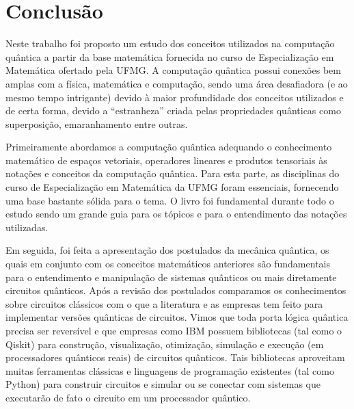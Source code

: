 
\chapter[Conclusão]{Conclusão}

Neste trabalho foi proposto um estudo dos conceitos utilizados na computação quântica a partir da base matemática fornecida no curso de Especialização em Matemática ofertado pela UFMG. A computação quântica possui conexões bem amplas com a física, matemática e computação, sendo uma área desafiadora (e ao mesmo tempo intrigante) devido à maior profundidade dos conceitos utilizados e de certa forma, devido a ``estranheza'' criada pelas propriedades quânticas como superposição, emaranhamento entre outras.

Primeiramente abordamos a computação quântica adequando o conhecimento matemático de espaços vetoriais, operadores lineares e produtos tensoriais às notações e conceitos da computação quântica. Para esta parte, as disciplinas do curso de Especialização em Matemática da UFMG foram essenciais, fornecendo uma base bastante sólida para o tema. O livro \cite{nielsen2010quantum} foi fundamental durante todo o estudo sendo um grande guia para os tópicos e para o entendimento das notações utilizadas.

Em seguida, foi feita a apresentação dos postulados da mecânica quântica, os quais em conjunto com os conceitos matemáticos anteriores são fundamentais para o entendimento e manipulação de sistemas quânticos ou mais diretamente circuitos quânticos. Após a revisão dos postulados comparamos os conhecimentos sobre circuitos clássicos com o que a literatura e as empresas tem feito para implementar versões quânticas de circuitos. Vimos que toda porta lógica quântica precisa ser reversível e que empresas como IBM possuem bibliotecas (tal como o Qiskit) para construção, visualização, otimização, simulação e execução (em processadores quânticos reais) de circuitos quânticos. Tais bibliotecas aproveitam muitas ferramentas clássicas e linguagens de programação existentes (tal como Python) para construir circuitos e simular ou se conectar com sistemas que executarão de fato o circuito em um processador quântico.

